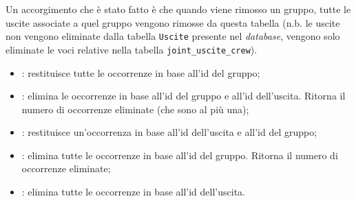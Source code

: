 Un accorgimento che è stato fatto è che quando viene rimosso un gruppo, tutte le uscite associate a quel gruppo vengono rimosse da questa tabella (n.b. le uscite non vengono eliminate dalla tabella \texttt{Uscite} presente nel \textit{database}, vengono solo eliminate le voci relative nella tabella \texttt{joint\_uscite\_crew}).
\begin{itemize}
    \item {}: restituisce tutte le occorrenze in base all'id del gruppo;
    \item {}: elimina le occorrenze in base all'id del gruppo e all'id dell'uscita. Ritorna il numero di occorrenze eliminate (che sono al più una);
    \item {}: restituisce un'occorrenza in base all'id dell'uscita e all'id del gruppo;
    \item {}: elimina tutte le occorrenze in base all'id del gruppo. Ritorna il numero di occorrenze eliminate;
    \item {}: elimina tutte le occorrenze in base all'id dell'uscita.
\end{itemize}






